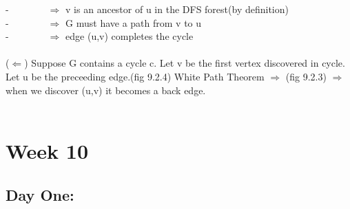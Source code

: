 \documentclass{article}
\begin{document}
	 -~~~~~~~~$\Rightarrow$ v is an ancestor of u in the DFS forest(by definition)\\
	 -~~~~~~~~$\Rightarrow$ G must have a path from v to u\\
	 -~~~~~~~~$\Rightarrow$ edge (u,v) completes the cycle\\\\
	 ($\Leftarrow$) Suppose G contains a cycle c. Let v be the first vertex discovered in cycle. Let u be the preceeding edge.(fig 9.2.4) White Path Theorem $\Rightarrow$ (fig 9.2.3) $\Rightarrow$ when we discover (u,v) it becomes a back edge.\\\\
	 
	\section{Week 10}
	\subsection{Day One: }
\end{document}
